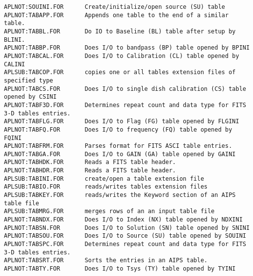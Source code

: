\begin{verbatim}
APLNOT:SOUINI.FOR      Create/initialize/open source (SU) table
APLNOT:TABAPP.FOR      Appends one table to the end of a similar table.
APLNOT:TABBL.FOR       Do IO to Baseline (BL) table after setup by BLINI.
APLNOT:TABBP.FOR       Does I/O to bandpass (BP) table opened by BPINI
APLNOT:TABCAL.FOR      Does I/O to Calibration (CL) table opened by CALINI
APLSUB:TABCOP.FOR      copies one or all tables extension files of specified type
APLNOT:TABCS.FOR       Does I/O to single dish calibration (CS) table opened by CSINI
APLNOT:TABF3D.FOR      Determines repeat count and data type for FITS 3-D tables entries.
APLNOT:TABFLG.FOR      Does I/O to Flag (FG) table opened by FLGINI
APLNOT:TABFQ.FOR       Does I/O to frequency (FQ) table opened by FQINI
APLNOT:TABFRM.FOR      Parses format for FITS ASCI table entries.
APLNOT:TABGA.FOR       Does I/O to GAIN (GA) table opened by GAINI
APLNOT:TABHDK.FOR      Reads a FITS table header.
APLNOT:TABHDR.FOR      Reads a FITS table header.
APLSUB:TABINI.FOR      create/open a table extension file
APLSUB:TABIO.FOR       reads/writes tables extension files
APLSUB:TABKEY.FOR      reads/writes the Keyword section of an AIPS table file
APLSUB:TABMRG.FOR      merges rows of an an input table file
APLNOT:TABNDX.FOR      Does I/O to Index (NX) table opened by NDXINI
APLNOT:TABSN.FOR       Does I/O to Solution (SN) table opened by SNINI
APLNOT:TABSOU.FOR      Does I/O to Source (SU) table opened by SOUINI
APLNOT:TABSPC.FOR      Determines repeat count and data type for FITS 3-D tables entries.
APLNOT:TABSRT.FOR      Sorts the entries in an AIPS table.
APLNOT:TABTY.FOR       Does I/O to Tsys (TY) table opened by TYINI
\end{verbatim}
 

